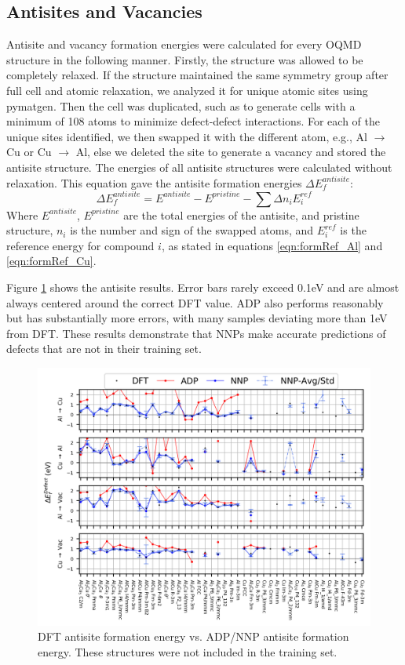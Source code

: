 \documentclass{article}
\begin{document}
\subsection{Antisites and Vacancies}
Antisite and vacancy formation energies were calculated for every OQMD structure in the following manner.
Firstly, the structure was allowed to be completely relaxed.
If the structure maintained the same symmetry group after full cell and atomic relaxation, we analyzed it for unique atomic sites using pymatgen.
Then the cell was duplicated, such as to generate cells with a minimum of 108 atoms to minimize defect-defect interactions.
For each of the unique sites identified, we then swapped it with the different atom, e.g., Al $\rightarrow$ Cu or Cu $\rightarrow$ Al, else we deleted the site to generate a vacancy and stored the antisite structure.
The energies of all antisite structures were calculated without relaxation.
This equation gave the antisite formation energies $\Delta E^{antisite}_f$:
\begin{equation}
\Delta E^{antisite}_f = E^{antisite} - E^{pristine} - \sum\Delta n_i E^{ref}_i
\end{equation}
Where $E^{antisite}$, $E^{pristine}$ are the total energies of the antisite, and pristine structure, $n_i$ is the 
number and sign of the swapped atoms, and $E^{ref}_i$ is the reference energy for compound $i$, as stated in 
equations \ref{eqn:formRef_Al} and \ref{eqn:formRef_Cu}.

Figure \ref{fig:antisite_plot} shows the antisite results.
Error bars rarely exceed 0.1eV and are almost always centered around the correct DFT value.
ADP also performs reasonably but has substantially more errors, with many samples deviating more than 1eV from DFT.
These results demonstrate that NNPs make accurate predictions of defects that are not in their training set. 

\begin{figure}[H]%
\centering%
\includegraphics[width=1\textwidth,center]{figures/antisite_vacancies.png}%
\caption{DFT antisite formation energy vs. ADP/NNP antisite formation energy.
These structures were not included in the training set.}%
\label{fig:antisite_plot}
\end{figure}
\end{document}
